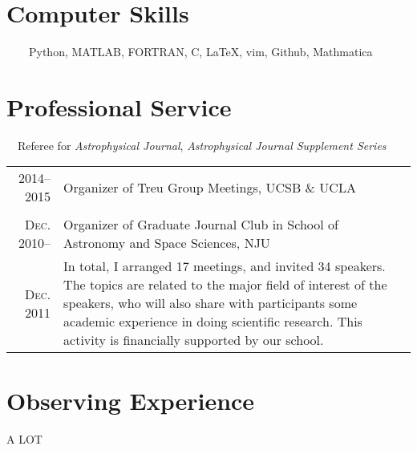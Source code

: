 \documentclass[letterpaper,10pt]{article}
\newcommand{\narrow}{-1.8ex}
\begin{document}
\section{Computer Skills}
~~~~Python, MATLAB, FORTRAN, C, \LaTeX, vim, Github, Mathmatica


\section{Professional Service}
~\textbullet~Referee for \textit{Astrophysical Journal}, \textit{Astrophysical Journal Supplement Series}

\begin{tabular}{r|p{5.6in}}

\textsc{2014--2015}  & Organizer of Treu Group Meetings, UCSB \& UCLA \\
\multicolumn{2}{c}{} \\[\narrow]

\textsc{Dec. 2010}--  & Organizer of Graduate Journal Club in School of Astronomy and Space Sciences, NJU \\
\textsc{Dec. 2011}    & \small{In total, I arranged 17 meetings, and invited 34 speakers.
        The topics are related to the major field of interest of the speakers, who will also share with
        participants some academic experience in doing scientific research. This activity is financially
        supported by our school.}  \\
\end{tabular}


\section{Observing Experience}
    A LOT


\end{document}

